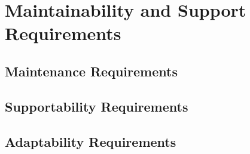 \chapter{Maintainability and Support Requirements}

\section{Maintenance Requirements}

\section{Supportability Requirements}

\section{Adaptability Requirements}
